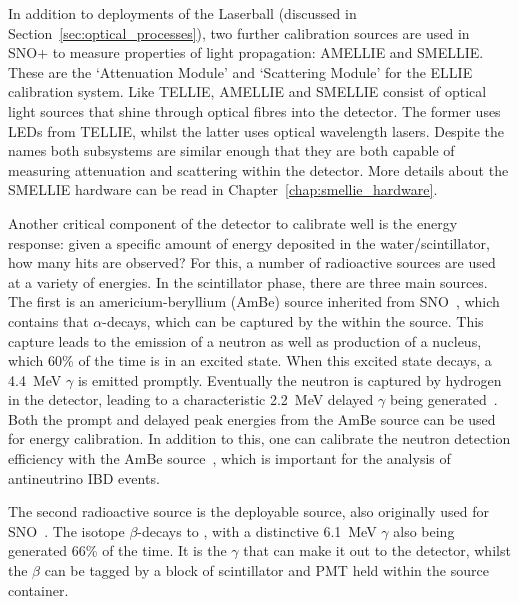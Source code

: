 In addition to deployments of the Laserball (discussed in Section~\ref{sec:optical_processes}), two further calibration sources are used in SNO+ to measure properties of light propagation: AMELLIE and SMELLIE. These are the `Attenuation Module' and `Scattering Module' for the ELLIE calibration system. Like TELLIE, AMELLIE and SMELLIE consist of optical light sources that shine through optical fibres into the detector. The former uses LEDs from TELLIE, whilst the latter uses optical wavelength lasers. Despite the names both subsystems are similar enough that they are both capable of measuring attenuation and scattering within the detector. More details about the SMELLIE hardware can be read in Chapter~\ref{chap:smellie_hardware}.

Another critical component of the detector to calibrate well is the energy response: given a specific amount of energy deposited in the water/scintillator, how many hits are observed? For this, a number of radioactive sources are used at a variety of energies. In the scintillator phase, there are three main sources. The first is an americium-beryllium (AmBe) source inherited from SNO~\cite{loachMeasurementFlux8B2008}, %
which contains  that $\alpha$-decays, which can be captured by the  within the source. This capture leads to the emission of a neutron as well as production of a  nucleus, which 60\% of the time is in  an excited state. When this excited state decays, a \SI{4.4}{\MeV} $\gamma$ is emitted promptly. Eventually the neutron is captured by hydrogen in the detector, leading to a characteristic \SI{2.2}{\MeV} delayed $\gamma$ being generated~\cite{albaneseSNOExperiment2021}. %
Both the prompt and delayed peak energies from the AmBe source can be used for energy calibration. In addition to this, one can calibrate the neutron detection efficiency with the AmBe source~\cite{loachMeasurementFlux8B2008}, %
which is important for the analysis of antineutrino IBD events. %

The second radioactive source is the  deployable source, also originally used for SNO~\cite{dragowsky16NCalibrationSource2002}. %
The  isotope $\beta$-decays to , with a distinctive \SI{6.1}{\MeV} $\gamma$ also being generated 66\% of the time. It is the $\gamma$ that can make it out to the detector, whilst the $\beta$ can be tagged by a block of scintillator and PMT held within the source container.

